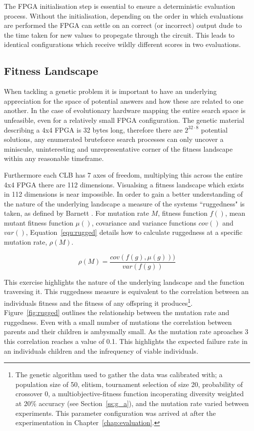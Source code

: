 The FPGA initialisation step is essential to ensure a deterministic evaluation
process. Without the initialisation, depending on the order in which evaluations
are performed the FPGA can settle on an correct (or incorrect) output dude to the
time taken for new values to propegate through the circuit. This leads to identical
configurations which receive wildly different scores in two evaluations.

\subsection{Fitness Landscape}

When tackling a genetic problem it is important to have an underlying appreciation
for the space of potential answers and how these are related to one another.
In the case of evolutionary hardware
mapping the entire search space is unfeasible, even for a relatively small
FPGA configuration.
The genetic material describing a 4x4 FPGA
is 32 bytes long, therefore there are $2^{32\cdot8}$ potential solutions, any
enumerated bruteforce search processes can only uncover a
miniscule, uninteresting and unrepresentative corner of the fitness landscape
within any reasonable timeframe.

Furthermore each CLB has 7 axes of freedom, multiplying this across the entire 4x4 FPGA
there are 112 dimensions. Visualsing a fitness landscape which exists in
112 dimensions is near impossible. In order to gain a better understanding
of the nature of the underlying landscape a measure of the systems ``ruggedness"
is taken, as defined by Barnett \cite{barnett2008ruggedness}. For mutation rate
$M$, fitness function $f()$, mean mutant fitness function $\mu()$, covariance and
variance functions $cov()$ and $var()$, Equation~\ref{equ:rugged} details how to
calculate ruggedness at a specific mutation rate, $\rho(M)$.

\begin{equation}
	\rho(M) = \frac{cov(f(g),\mu(g)))}{var(f(g))}
	\label{equ:rugged}
\end{equation}

This exercise highlights the nature of the underlying landscape and the function
traversing it.
This ruggedness measure is equivalent to the correlation between an individuals
fitness and the fitness of any offspring it produces\footnote{The genetic algorithm
used to gather the data was calibrated with; a population
size of 50, elitism, tournament selection of size 20, probability of crossover 0,
a multiobjective-fitness function incoperating diversity weighted at 20\% accuracy
(see Section~\ref{ss:g_a}), and the mutation rate varied between experiments. This parameter
configuration was arrived at after the experimentation in Chapter~\ref{chap:evaluation}.}.
Figure~\ref{fig:rugged} outlines the relationship between the mutation rate and
ruggedness. Even with a small number of mutations the correlation between parents
and their children is ambysmally small. As the mutation rate aproaches 3 this correlation
reaches a value of 0.1. This highlights the expected failure rate in an individuals children
and the infrequency of viable individuals.


